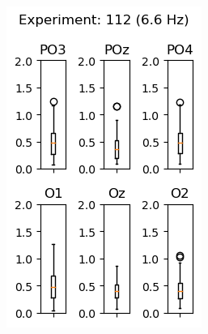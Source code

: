 \begin{figure}[ht]
    \begin{subfigure}{0.25\linewidth}
        \includegraphics[width=\linewidth]{images/appendix/11266.png}
        \label{fig:11266}
    \end{subfigure}
    \begin{subfigure}{0.25\linewidth}

\end{subfigure}
\end{figure}
